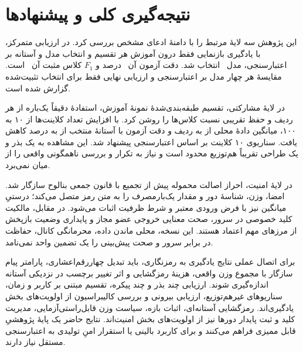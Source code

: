 \chapter*{نتیجه‌گیری کلی و پیشنهادها}
این پژوهش سه لایۀ مرتبط را با دامنۀ ادعای مشخص بررسی کرد. در ارزیابی متمرکز، با یادگیری بازنمایی فقط درون آموزش هر تقسیم و انتخاب مدل و آستانه بر اعتبارسنجی، مدل \BestModel\ انتخاب شد. دقت آزمون آن \BestTestAccuracyPercent\ درصد و $F_1$ کلاس مثبت آن \BestTestFone\ است. مقایسۀ هر چهار مدل بر اعتبارسنجی و ارزیابی نهایی فقط برای انتخاب تثبیت‌شده گزارش شده است.

در لایۀ مشارکتی، تقسیم طبقه‌بندی‌شدۀ  نمونۀ آموزش، استفادۀ دقیقاً یک‌باره از هر ردیف و حفظ تقریبی نسبت کلاس‌ها را روشن کرد. با افزایش تعداد کلاینت‌ها از ۱۰ به ۱۰۰، میانگین دادۀ محلی از  به  ردیف و دقت آزمون با آستانۀ منتخب از  به  درصد کاهش یافت. سناریوی ۱۰ کلاینت بر اساس اعتبارسنجی پیشنهاد شد. این مشاهده به یک بذر و یک طراحی تقریباً هم‌توزیع محدود است و نیاز به تکرار و بررسی ناهمگونی واقعی را از میان نمی‌برد.

در لایۀ امنیت، احراز اصالت محموله پیش از تجمیع با قانون جمعی بنالوح سازگار شد. امضا، وزن، شناسۀ دور و مقدار یک‌بارمصرف را به متن رمز متصل می‌کند؛ درستیِ میانگین نیز با فرض ورودی معتبر و شرط ظرفیت اثبات می‌شود. در مقابل، مالکیت کلید خصوصی در سرور، صحت معنایی خروجی عضو مجاز و پایداری وضعیت بازپخش از مرزهای مهم اعتماد هستند. این نسخه، محلی ماندن داده، محرمانگی کانال، حفاظت در برابر سرور و صحت پیش‌بینی را یک تضمین واحد نمی‌نامد.

برای اتصال عملی نتایج یادگیری به رمزنگاری، باید تبدیل چهاررقم‌اعشاری، پارامتر پیام سازگار با مجموع وزن واقعی، هزینۀ رمزگشایی و اثر تغییر برچسب در نزدیکی آستانه اندازه‌گیری شوند. ارزیابی چند بذر و چند پیکره، تقسیم مبتنی بر کاربر و زمان، سناریوهای غیرهم‌توزیع، ارزیابی بیرونی و بررسی کالیبراسیون از اولویت‌های بخش یادگیری‌اند. رمزگشایی آستانه‌ای، اثبات بازه، سیاست وزن قابل‌راستی‌آزمایی، مدیریت کلید و ثبت پایدار دورها نیز از اولویت‌های بخش امنیت‌اند. نتایج حاضر یک پایۀ پژوهشیِ قابل ممیزی فراهم می‌کنند و برای کاربرد بالینی یا استقرار امنِ تولیدی به اعتبارسنجی مستقل نیاز دارند.
